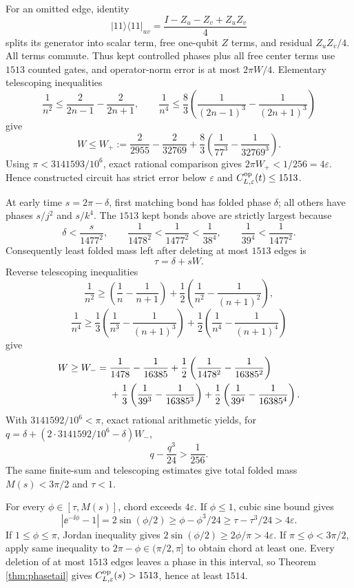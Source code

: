 For an omitted edge, identity
\[
 |11\rangle\!\langle11|_{uv}
 =\frac{I-Z_u-Z_v+Z_uZ_v}{4}
\]
splits its generator into scalar term, free one-qubit $Z$ terms, and residual
$Z_uZ_v/4$.  All terms commute.  Thus kept controlled phases plus all free
center terms use $1513$ counted gates, and operator-norm error is at most
$2\pi W/4$.  Elementary telescoping inequalities
\[
 \frac1{n^2}\le\frac2{2n-1}-\frac2{2n+1},\qquad
 \frac1{n^4}\le\frac83\left(\frac1{(2n-1)^3}-
   \frac1{(2n+1)^3}\right)
\]
give
\begin{equation}
 W\le W_+:=\frac2{2955}-\frac2{32769}
 +\frac83\left(\frac1{77^3}-\frac1{32769^3}\right). \label{eq:counterWplus}
\end{equation}
Using $\pi<3141593/10^6$, exact rational comparison gives
$2\pi W_+<1/256=4\varepsilon$.  Hence constructed circuit has strict error
below $\varepsilon$ and
$C^{\rm op}_{L,\varepsilon}(t)\le1513$.

At early time $s=2\pi-\delta$, first matching bond has folded phase $\delta$;
all others have phases $s/j^2$ and $s/k^4$.  The $1513$ kept bonds above are
strictly largest because
\[
 \delta<\frac{s}{1477^2},\qquad
 \frac1{1478^2}<\frac1{1477^2}<\frac1{38^4},\qquad
 \frac1{39^4}<\frac1{1477^2}.
\]
Consequently least folded mass left after deleting at most $1513$ edges is
\begin{equation}
 \tau=\delta+sW.                                      \label{eq:countertau}
\end{equation}
Reverse telescoping inequalities
\[
 \frac1{n^2}\ge\left(\frac1n-\frac1{n+1}\right)
 +\frac12\left(\frac1{n^2}-\frac1{(n+1)^2}\right),
\]
\[
 \frac1{n^4}\ge\frac13\left(\frac1{n^3}-\frac1{(n+1)^3}\right)
 +\frac12\left(\frac1{n^4}-\frac1{(n+1)^4}\right)
\]
give
\begin{align}
 W\ge W_-={}&\frac1{1478}-\frac1{16385}
 +\frac12\left(\frac1{1478^2}-\frac1{16385^2}\right)\notag\\
 &+\frac13\left(\frac1{39^3}-\frac1{16385^3}\right)
 +\frac12\left(\frac1{39^4}-\frac1{16385^4}\right). \label{eq:counterWminus}
\end{align}
With $3141592/10^6<\pi$, exact rational arithmetic yields, for
$q=\delta+(2\cdot3141592/10^6-\delta)W_-$,
\begin{equation}
 q-\frac{q^3}{24}>\frac1{256}.                       \label{eq:countercubic}
\end{equation}
The same finite-sum and telescoping estimates give total folded mass
$M(s)<3\pi/2$ and $\tau<1$.

For every $\phi\in[\tau,M(s)]$, chord exceeds $4\varepsilon$.  If
$\phi\le1$, cubic sine bound gives
\[
 |\ee^{-\ii\phi}-1|=2\sin(\phi/2)
 \ge\phi-\phi^3/24\ge\tau-\tau^3/24>4\varepsilon.
\]
If $1\le\phi\le\pi$, Jordan inequality gives
$2\sin(\phi/2)\ge2\phi/\pi>4\varepsilon$.  If
$\pi\le\phi<3\pi/2$, apply same inequality to $2\pi-\phi\in(\pi/2,\pi]$ to
obtain chord at least one.  Every deletion of at most $1513$ edges leaves a
phase in this interval, so Theorem \ref{thm:phasetail} gives
$C^{\rm op}_{L,\varepsilon}(s)>1513$, hence at least $1514$.

